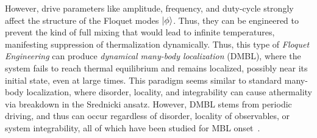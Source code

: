 \documentclass[%
reprint,
superscriptaddress,
amsmath,amssymb,
aps,
prb,
showkeys,
]{revtex4-2}
\begin{document}
However, drive parameters like amplitude, frequency, and duty-cycle strongly affect the structure of the Floquet modes $\ket{\phi}$. Thus, they can be engineered to prevent the kind of full mixing that would lead to infinite temperatures, manifesting suppression of thermalization dynamically. Thus, this type of \textit{Floquet Engineering} can produce \textit{dynamical many-body localization} (DMBL), where the system fails to reach thermal equilibrium and remains localized, possibly  near its initial state, even at large times. This paradigm seems similar to standard many-body localization\cite{Sougata2023, sierant_2023}, where disorder, locality, and integrability can cause athermality via breakdown in the Srednicki ansatz. However, DMBL {stems from periodic driving}, and thus can occur regardless of disorder, locality of observables, or system integrability, all of which have been studied for MBL onset~\cite{Sougata2023,Fabien2018,garratt_resonant_2022}.
\end{document}
